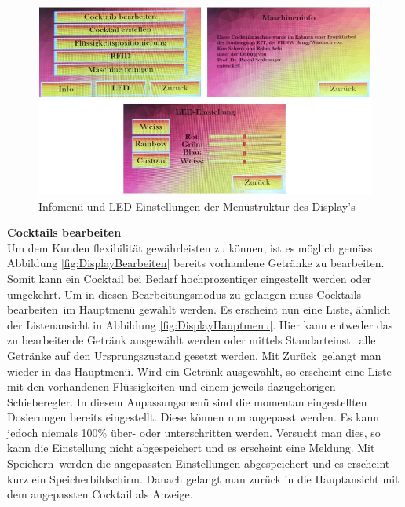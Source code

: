 \begin{figure}[H]
	\centering
	\includegraphics[width=\textwidth]{graphics/DisplayInfoLed}
	\caption{Infomenü und LED Einstellungen der Menüstruktur des Display's}
	\label{fig:DisplayInfoLed}
\end{figure}

\textbf{Cocktails bearbeiten}\\
Um dem Kunden flexibilität gewährleisten zu können, ist es möglich gemäss Abbildung \ref{fig:DisplayBearbeiten} bereits vorhandene Getränke zu bearbeiten. Somit kann ein Cocktail bei Bedarf hochprozentiger eingestellt werden oder umgekehrt. Um in diesen Bearbeitungsmodus zu gelangen muss \flqq Cocktails bearbeiten\frqq~im Hauptmenü gewählt werden. Es erscheint nun eine Liste, ähnlich der Listenansicht in Abbildung \ref{fig:DisplayHauptmenu}. Hier kann entweder das zu bearbeitende Getränk ausgewählt werden oder mittels \flqq Standarteinst.\frqq~alle Getränke auf den Ursprungszustand gesetzt werden. Mit \flqq Zurück\frqq~gelangt man wieder in das Hauptmenü. Wird ein Getränk ausgewählt, so erscheint eine Liste mit den vorhandenen Flüssigkeiten und einem jeweils dazugehörigen Schieberegler. In diesem Anpassungsmenü sind die momentan eingestellten Dosierungen bereits eingestellt. Diese können nun angepasst werden. Es kann jedoch niemals 100\% über- oder unterschritten werden. Versucht man dies, so kann die Einstellung nicht abgespeichert und es erscheint eine Meldung. Mit \flqq Speichern\frqq~werden die angepassten Einstellungen abgespeichert und es erscheint kurz ein Speicherbildschirm. Danach gelangt man zurück in die Hauptansicht mit dem angepassten Cocktail als Anzeige.

